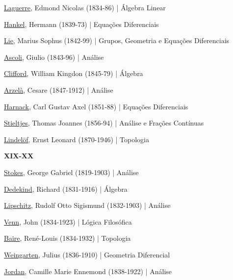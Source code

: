 \documentclass[12pt,a4paper]{article}
\begin{document}
			\href{http://en.wikipedia.org/wiki/Laguerre}{Laguerre}, Edmond Nicolas (1834-86) | \'Algebra Linear

			\href{http://en.wikipedia.org/wiki/Hankel}{Hankel}, Hermann (1839-73) | Equa\c{c}\~oes Diferenciais

			\href{http://en.wikipedia.org/wiki/Sophus_Lie}{Lie}, Marius Sophus (1842-99) | Grupos, Geometria e Equa\c{c}\~oes Diferenciais

			\href{http://en.wikipedia.org/wiki/Giulio_Ascoli}{Ascoli}, Giulio (1843-96) | An\'alise

			\href{http://en.wikipedia.org/wiki/William_Kingdon_Clifford}{Clifford}, William Kingdon (1845-79) | \'Algebra

			\href{http://pt.wikipedia.org/wiki/Cesare_Arzel\%C3\%A0}{Arzel\`a}, Cesare (1847-1912) | An\'alise

			\href{http://en.wikipedia.org/wiki/Carl_Gustav_Axel_Harnack}{Harnack}, Carl Gustav Axel (1851-88) | Equa\c{c}\~oes Diferenciais

			\href{http://en.wikipedia.org/wiki/Stieltjes}{Stieltjes}, Thomas Joannes (1856-94) | An\'alise e Fra\c{c}\~oes Cont\'inuas

			\href{http://en.wikipedia.org/wiki/Ernst_Leonard_Lindel\%C3\%B6f}{Lindelöf}, Ernst Leonard (1870-1946) | Topologia

			\begin{flushright}
			\end{flushright}

			\textbf{XIX-XX}

			\href{http://pt.wikipedia.org/wiki/George_Gabriel_Stokes}{Stokes}, George Gabriel (1819-1903) | An\'alise

			\href{http://pt.wikipedia.org/wiki/Richard_Dedekind}{Dedekind}, Richard (1831-1916) | \'Algebra

			\href{http://pt.wikipedia.org/wiki/Rudolf_Lipschitz}{Lipschitz}, Rudolf Otto Sigismund (1832-1903) | An\'alise

			\href{http://en.wikipedia.org/wiki/John_Venn}{Venn}, John (1834-1923) | L\'ogica Filos\'ofica

			\href{http://en.wikipedia.org/wiki/Baire}{Baire}, Ren\'e-Louis (1834-1932) | Topologia

			\href{http://en.wikipedia.org/wiki/Julius_Weingarten}{Weingarten}, Julius (1836-1910) | Geometria Diferencial

			\href{http://pt.wikipedia.org/wiki/Camille_Jordan}{Jordan}, Camille Marie Ennemond (1838-1922) | An\'alise
\end{document}
